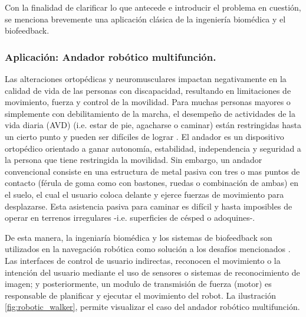 Con la finalidad de clarificar lo que antecede e introducir el problema en cuestión, se  menciona brevemente una aplicación clásica de la ingeniería biomédica y el biofeedback. 

\subsubsection{Aplicación: Andador robótico multifunción.}

Las alteraciones ortopédicas y neuromusculares impactan negativamente en la calidad de vida de las personas con discapacidad, resultando en limitaciones de movimiento, fuerza y control de la movilidad. Para muchas personas mayores o simplemente con debilitamiento de la marcha, el desempeño de actividades de la vida diaria (AVD) (i.e. estar de pie, agacharse o caminar) están restringidas hasta un cierto punto y pueden ser difíciles de lograr \cite{walkerConger2011}. El andador es un dispositivo ortopédico orientado a ganar autonomía, estabilidad, independencia y seguridad a la persona que tiene restringida la movilidad. Sin embargo, un andador convencional consiste en una estructura de metal pasiva con tres o mas puntos de contacto (férula de goma como con bastones, ruedas o combinación de ambas) en el suelo, el cual el usuario coloca delante y ejerce fuerzas de movimiento para desplazarse. Esta asistencia pasiva para caminar es difícil y hasta imposibles de operar en terrenos irregulares -i.e. superficies de césped o adoquines-.

De esta manera, la ingeniaría biomédica y los sistemas de biofeedback son utilizados en la navegación robótica como solución a los desafíos mencionados \cite{walker8914379,walker8688067}. Las interfaces de control de usuario indirectas, reconocen el movimiento o la intención del usuario mediante el uso de sensores o sistemas de reconocimiento de imagen; y posteriormente, un modulo de transmisión de fuerza (motor) es responsable de  planificar y ejecutar el movimiento del robot. La ilustración \ref{fig:robotic_walker}, permite visualizar el caso del andador robótico multifunción.


